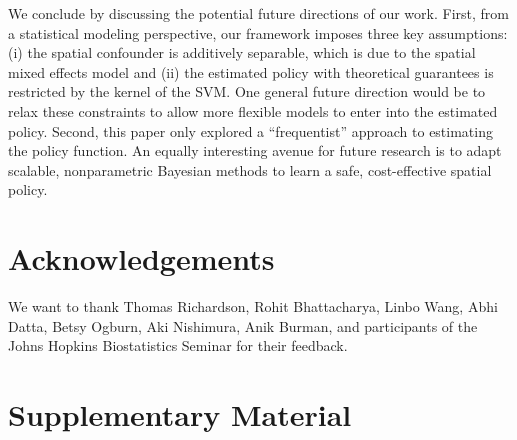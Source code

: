 \documentclass[12pt]{article}
\begin{document}
We conclude by discussing the potential future directions of our work. First, from a statistical modeling perspective, our framework imposes three key assumptions: (i) the spatial confounder is additively separable, which is due to the spatial mixed effects model and (ii) the estimated policy with theoretical guarantees is restricted by the kernel of the SVM. %
One general future direction would be to relax these constraints to allow more flexible models to enter into the estimated policy. Second, this paper only explored a ``frequentist'' approach to estimating the policy function. An equally interesting avenue for future research is to adapt scalable, nonparametric Bayesian methods to learn a safe, cost-effective spatial policy. 


\section*{Acknowledgements}
We want to thank Thomas Richardson, Rohit Bhattacharya, Linbo Wang,  Abhi Datta,  Betsy Ogburn, Aki Nishimura, Anik Burman, and participants of the Johns Hopkins Biostatistics Seminar for their feedback.















\clearpage
\section*{Supplementary Material}

\appendix
\end{document}
